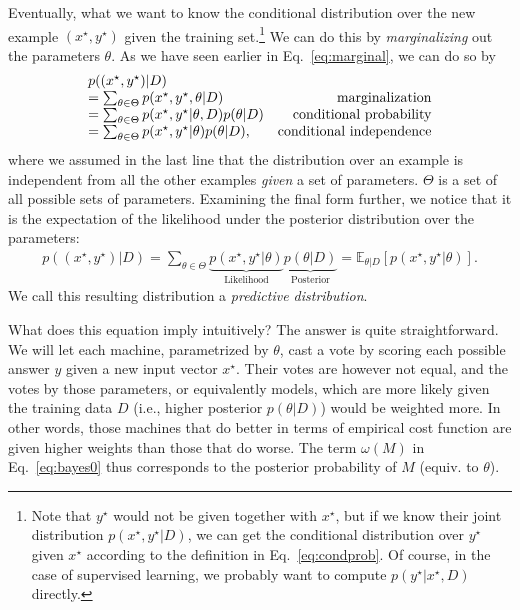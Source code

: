 \documentclass{report}
\newcommand{\E}[0]{\mathbb{E}}
\begin{document}
Eventually, what we want to know the conditional distribution over the new
example $(x^\star,y^\star)$ given the training set.\footnote{
    Note that $y^\star$ would not be given together with $x^\star$, but if we
    know their joint distribution $p(x^\star, y^\star|D)$, we can get the
    conditional distribution over $y^\star$ given $x^\star$ according to the
    definition in Eq.~\eqref{eq:condprob}. Of course, in the case of supervised
    learning, we probably want to compute $p(y^\star|x^\star, D)$ directly.
} 
We can do this by {\it marginalizing} out the parameters $\theta$. As we have
seen earlier in Eq.~\eqref{eq:marginal}, we can do so by
\begin{align*}
    \begin{array}{l r}
        p((x^\star, y^\star)|D) & \\
        = \sum_{\theta \in \Theta} p(x^\star, y^\star, \theta|D) &
        \text{marginalization} \\
        = \sum_{\theta \in \Theta} p(x^\star, y^\star|\theta,D)p(\theta|D) &
        \text{conditional probability} \\
        = \sum_{\theta \in \Theta} p(x^\star, y^\star|\theta)p(\theta|D), &
        \text{conditional independence} 
    \end{array}
\end{align*}
where we assumed in the last line that the distribution over an example is
independent from all the other examples {\it given} a set of parameters.
$\Theta$ is a set of all possible sets of parameters.  Examining the final form
further, we notice that it is the expectation of the likelihood under the
posterior distribution over the parameters:
\begin{align*}
    p((x^\star, y^\star)|D) =
        \sum_{\theta \in \Theta} 
        \underbrace{
            p(x^\star, y^\star|\theta)
        }_{\text{Likelihood}}
        \underbrace{
            p(\theta|D)
        }_{\text{Posterior}}
        = \E_{\theta|D} \left[ p(x^\star, y^\star|\theta) \right].
\end{align*}
We call this resulting distribution a {\it predictive distribution}.

What does this equation imply intuitively? The answer is quite straightforward.
We will let each machine, parametrized by $\theta$, cast a vote by scoring each
possible answer $y$ given a new input vector $x^\star$. Their votes are however
not equal, and the votes by those parameters, or equivalently models, which are
more likely given the training data $D$ (i.e., higher posterior $p(\theta | D)$)
would be weighted more. In other words, those machines that do better in terms
of empirical cost function are given higher weights than those that do worse.
The term $\omega(M)$ in Eq.~\eqref{eq:bayes0} thus corresponds to the posterior
probability of $M$ (equiv. to $\theta$). 
\end{document}

